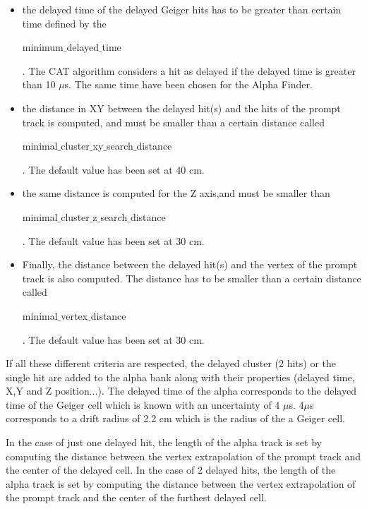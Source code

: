\documentclass[main.tex]{subfiles}
\begin{document}
\begin{itemize}


\item the delayed time of the delayed Geiger hits has to be greater than certain time defined by the \begin{ttfamily}minimum$\_$delayed$\_$time\end{ttfamily}. The CAT algorithm considers a hit as delayed if the delayed time is greater than 10 $\mu$s. The same time have been chosen for the Alpha Finder.


\item the distance in XY between the delayed hit(s) and the hits of the prompt track is computed, and must be smaller than a certain distance called \\
\begin{ttfamily}minimal$\_$cluster$\_$xy$\_$search$\_$distance\end{ttfamily}. The default value has been set at 40 cm.


\item the same distance is computed for the Z axis,and must be smaller than \\
 \begin{ttfamily}minimal$\_$cluster$\_$z$\_$search$\_$distance\end{ttfamily}. The default value has been set at 30 cm.


\item Finally, the distance between the delayed hit(s) and the vertex of the prompt track is also computed. The distance has to be smaller than a certain distance called \begin{ttfamily}minimal$\_$vertex$\_$distance\end{ttfamily}. The default value has been set at 30 cm.


\end{itemize}


\noindent If all these different criteria are respected, the delayed cluster (2 hits) or the single hit are added to the alpha bank along with their properties (delayed time, X,Y and Z position...). The delayed time of the alpha corresponds to the delayed time of the Geiger cell which is known with an uncertainty of 4 $\mu$s. 4$\mu$s corresponds to a drift radius of 2.2 cm which is the radius of the a Geiger cell. 


\bigskip


\noindent In the case of just one delayed hit, the length of the alpha track is set by computing the distance between the vertex extrapolation of the prompt track and the center of the delayed cell. In the case of 2 delayed hits, the length of the alpha track is set by computing the distance between the vertex extrapolation of the prompt track and the center of the furthest delayed cell.
\end{document}

